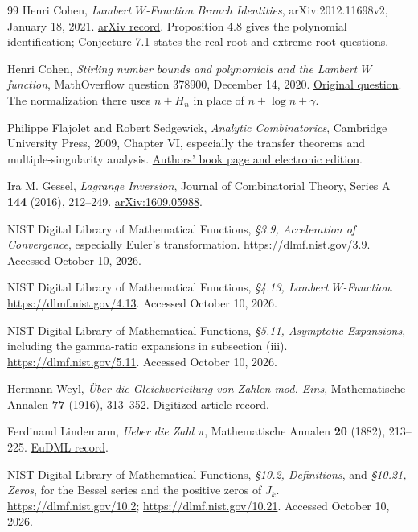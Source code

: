 \documentclass[11pt]{article}
\numberwithin{equation}{section}
\theoremstyle{definition}
\theoremstyle{remark}
\begin{document}
\begin{thebibliography}{99}
Henri Cohen, \emph{Lambert $W$-Function Branch Identities},
arXiv:2012.11698v2, January 18, 2021.
\href{https://arxiv.org/abs/2012.11698}{arXiv record}.
Proposition 4.8 gives the polynomial identification;
Conjecture 7.1 states the real-root and extreme-root questions.

Henri Cohen,
\emph{Stirling number bounds and polynomials and the Lambert $W$ function},
MathOverflow question 378900, December 14, 2020.
\href{https://mathoverflow.net/questions/378900/stirling-number-bounds-and-polynomials-and-the-lambert-w-function}{Original question}.
The normalization there uses $n+H_n$ in place of $n+\log n+\gamma$.

Philippe Flajolet and Robert Sedgewick,
\emph{Analytic Combinatorics}, Cambridge University Press, 2009,
Chapter VI, especially the transfer theorems and multiple-singularity
analysis.
\href{https://algo.inria.fr/flajolet/Publications/AnaCombi/anacombi.html}{Authors' book page and electronic edition}.

Ira M. Gessel, \emph{Lagrange Inversion},
Journal of Combinatorial Theory, Series A \textbf{144} (2016), 212--249.
\href{https://arxiv.org/abs/1609.05988}{arXiv:1609.05988}.

NIST Digital Library of Mathematical Functions,
\emph{\S3.9, Acceleration of Convergence}, especially Euler's
transformation.
\url{https://dlmf.nist.gov/3.9}.
Accessed October 10, 2026.

NIST Digital Library of Mathematical Functions,
\emph{\S4.13, Lambert $W$-Function}.
\url{https://dlmf.nist.gov/4.13}.
Accessed October 10, 2026.

NIST Digital Library of Mathematical Functions,
\emph{\S5.11, Asymptotic Expansions}, including the gamma-ratio
expansions in subsection (iii).
\url{https://dlmf.nist.gov/5.11}.
Accessed October 10, 2026.

Hermann Weyl, \emph{\"Uber die Gleichverteilung von Zahlen mod. Eins},
Mathematische Annalen \textbf{77} (1916), 313--352.
\href{https://zenodo.org/records/2425535}{Digitized article record}.

Ferdinand Lindemann, \emph{Ueber die Zahl $\pi$},
Mathematische Annalen \textbf{20} (1882), 213--225.
\href{https://eudml.org/doc/157031}{EuDML record}.

NIST Digital Library of Mathematical Functions,
\emph{\S10.2, Definitions}, and \emph{\S10.21, Zeros},
for the Bessel series and the positive zeros of $J_k$.
\url{https://dlmf.nist.gov/10.2};
\url{https://dlmf.nist.gov/10.21}.
Accessed October 10, 2026.


\end{thebibliography}
\end{document}

